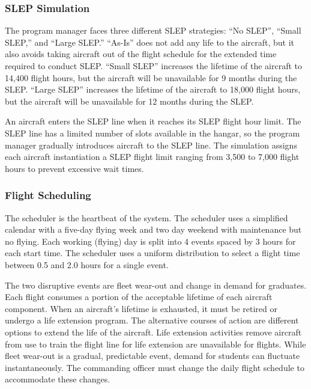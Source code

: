 \documentclass[preprint,12pt]{elsarticle}
\begin{document}
\subsubsection{SLEP Simulation}

The program manager faces three different SLEP strategies: ``No
SLEP'', ``Small SLEP,'' and ``Large SLEP.'' ``As-Is'' does not add any
life to the aircraft, but it also avoids 
taking aircraft out of the flight schedule for the extended time
required to conduct SLEP. ``Small SLEP'' increases the 
lifetime of the aircraft to 14,400 flight hours, 
but the aircraft will be unavailable for 9 months during the
SLEP. ``Large SLEP'' increases the lifetime of the
aircraft to 18,000 flight hours, but the aircraft will be unavailable for
12 months during the SLEP.

An aircraft enters the SLEP line when it reaches its SLEP flight hour
limit. The SLEP line has a limited number of slots available in the
hangar, so the program manager gradually introduces aircraft to the
SLEP line. The simulation assigns each aircraft instantiation a SLEP
flight limit ranging from 3,500  to 7,000 flight hours to prevent
excessive wait times.  

\subsubsection{Flight Scheduling}
The scheduler is the heartbeat of the system. The scheduler uses a
simplified calendar with a five-day flying week and two day weekend
with maintenance but no flying. Each working (flying) day is split into 4
events spaced by 3 hours for each start time. The scheduler uses a
uniform distribution to select a flight time between 0.5 and 2.0 hours
for a single event.

The two disruptive events
are fleet wear-out and change in demand for graduates. Each flight
consumes a portion of the acceptable lifetime of each aircraft
component. When an aircraft's lifetime is exhausted, it must be
retired or undergo a life extension program. The alternative courses
of action are different options to extend the life of the
aircraft. Life extension activities remove aircraft from use to train
the flight line for life extension are unavailable for flights. While
fleet wear-out is a gradual, predictable event, demand for students
can fluctuate instantaneously.  The commanding officer must change the
daily flight schedule to accommodate these changes.
\end{document}

